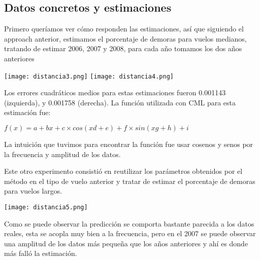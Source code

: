 \subsection{Datos concretos y estimaciones}

Primero queríamos ver cómo responden las estimaciones, así que siguiendo el approach anterior, estimamos el porcentaje de demoras para vuelos medianos, tratando de estimar 2006, 2007 y 2008, para cada año tomamos los dos años anteriores

\texttt{[image: distancia3.png]}
\texttt{[image: distancia4.png]}

Los errores cuadráticos medios para estas estimaciones fueron 0.001143 (izquierda), y 0.001758 (derecha). La función utilizada con CML para esta estimación fue:

\bigskip

$f(x) = a + bx + c \times cos(xd + e) + f \times sin(xg + h) + i$

La intuición que tuvimos para encontrar la función fue usar cosenos y senos por la frecuencia y amplitud de los datos.

Este otro experimento consistió en reutilizar los parámetros obtenidos por el método en el tipo de vuelo anterior y tratar de estimar el porcentaje de demoras para vuelos largos.

\texttt{[image: distancia5.png]}

Como se puede observar la predicción se comporta bastante parecida a los datos reales, esta se acopla muy bien a la frecuencia, pero en el 2007 se puede observar una amplitud de los datos más pequeña que los años anteriores y ahí es donde más falló la estimación.